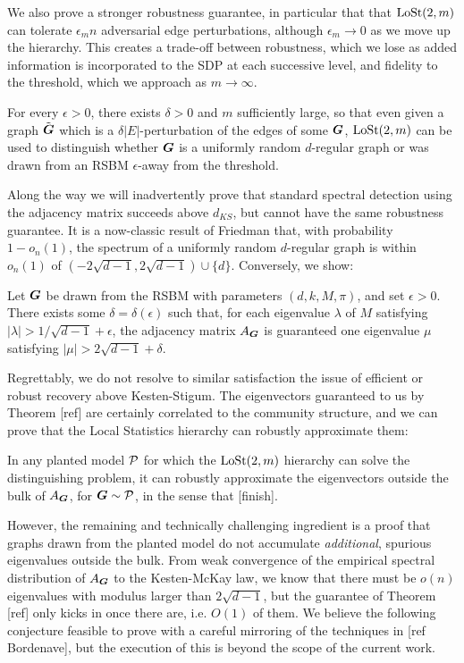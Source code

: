 We also prove a stronger robustness guarantee, in particular that that $\operatorname{LoSt}(2,m)$ can tolerate $\epsilon_m n$ adversarial edge perturbations, although $\epsilon_m \to 0$ as we move up the hierarchy. This creates a trade-off between robustness, which we lose as added information is incorporated to the SDP at each successive level, and fidelity to the threshold, which we approach as $m\to\infty$.

\begin{theorem}
For every $\epsilon > 0$, there exists $\delta > 0$ and $m$ sufficiently large, so that even given a graph $\tilde{\boldsymbol{G}}$ which is a $\delta|E|$-perturbation of the edges of some $\boldsymbol{G}$, $\operatorname{LoSt}(2,m)$ can be used to distinguish whether $\boldsymbol{G}$ is a uniformly random $d$-regular graph or was drawn from an RSBM $\epsilon$-away from the threshold.
\end{theorem}

Along the way we will inadvertently prove that standard spectral detection using the adjacency matrix succeeds above $d_{KS}$, but cannot have the same robustness guarantee. It is a now-classic result of Friedman that, with probability $1 - o_n(1)$, the spectrum of a uniformly random $d$-regular graph is within $o_n(1)$ of $(-2\sqrt{d-1},2\sqrt{d-1})\cup\{d\}$. Conversely, we show:

\begin{corollary}
	Let $\boldsymbol{G}$ be drawn from the RSBM with parameters $(d,k,M,\pi)$, and set $\epsilon > 0$. There exists some $\delta = \delta(\epsilon)$ such that, for each eigenvalue $\lambda$ of $M$ satisfying $|\lambda| > 1/\sqrt{d-1} + \epsilon$, the adjacency matrix $A_{\boldsymbol{G}}$  is guaranteed one eigenvalue $\mu$ satisfying $|\mu| > 2\sqrt{d-1} + \delta$.
\end{corollary}

Regrettably, we do not resolve to similar satisfaction the issue of efficient or robust recovery above Kesten-Stigum. The eigenvectors guaranteed to us by Theorem [ref] are certainly correlated to the community structure, and we can prove that the Local Statistics hierarchy can robustly approximate them: 

\begin{theorem}
	In any planted model $\mathcal{P}$ for which the $\operatorname{LoSt}(2,m)$ hierarchy can solve the distinguishing problem, it can robustly approximate the eigenvectors outside the bulk of $A_{\boldsymbol{G}}$, for $\boldsymbol{G} \sim \mathcal{P}$, in the sense that [finish].
\end{theorem}

However, the remaining and technically challenging ingredient is a proof that graphs drawn from the planted model do not accumulate \emph{additional}, spurious eigenvalues outside the bulk. From weak convergence of the empirical spectral distribution of $A_{\boldsymbol{G}}$ to the Kesten-McKay law, we know that there must be $o(n)$ eigenvalues with modulus larger than $2\sqrt{d-1}$, but the guarantee of Theorem [ref] only kicks in once there are, i.e. $O(1)$ of them. We believe the following conjecture feasible to prove with a careful mirroring of the techniques in [ref Bordenave], but the execution of this is beyond the scope of the current work.

